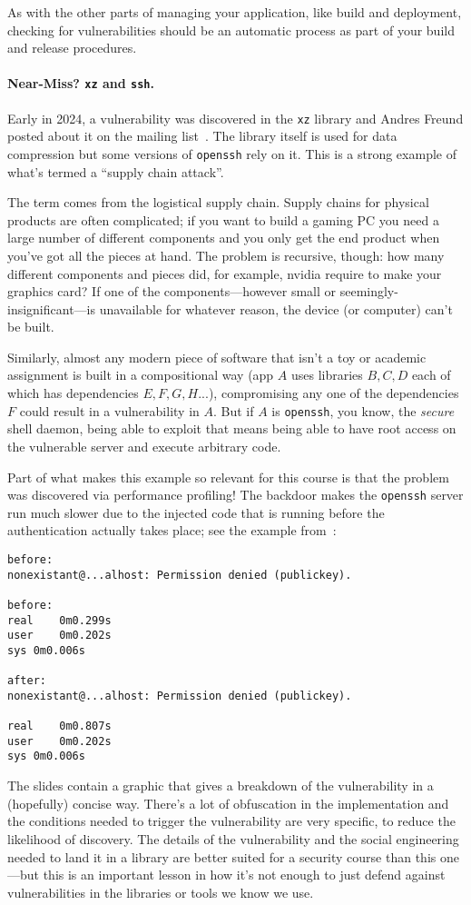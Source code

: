 As with the other parts of managing your application, like build and deployment, checking for vulnerabilities should be an automatic process as part of your build and release procedures. 


\paragraph{Near-Miss? \texttt{xz} and \texttt{ssh}.} Early in 2024, a vulnerability was discovered in the \texttt{xz} library and Andres Freund posted about it on the mailing list~\cite{xzlib}. The library itself is used for data compression but some versions of \texttt{openssh} rely on it. This is a strong example of what's termed a ``supply chain attack''. 

The term comes from the logistical supply chain. Supply chains for physical products are often complicated; if you want to build a gaming PC you need a large number of different components and you only get the end product when you've got all the pieces at hand. The problem is recursive, though: how many different components and pieces did, for example, nvidia require to make your graphics card? If one of the components---however small or seemingly-insignificant---is unavailable for whatever reason, the device (or computer) can't be built. 

Similarly, almost any modern piece of software that isn't a toy or academic assignment is built in a compositional way (app $A$ uses libraries $B, C, D$ each of which has dependencies $E, F, G, H...$), compromising any one of the dependencies $F$ could result in a vulnerability in $A$. But if $A$ is \texttt{openssh}, you know, the \textit{secure} shell daemon, being able to exploit that means being able to have root access on the vulnerable server and execute arbitrary code. 

Part of what makes this example so relevant for this course is that the problem was discovered via performance profiling! The backdoor makes the \texttt{openssh} server run much slower due to the injected code that is running before the authentication actually takes place; see the example from~\cite{xzlib}:

\begin{verbatim}
before:
nonexistant@...alhost: Permission denied (publickey).

before:
real	0m0.299s
user	0m0.202s
sys	0m0.006s

after:
nonexistant@...alhost: Permission denied (publickey).

real	0m0.807s
user	0m0.202s
sys	0m0.006s
\end{verbatim}

The slides contain a graphic that gives a breakdown of the vulnerability in a (hopefully) concise way. There's a lot of obfuscation in the implementation and the conditions needed to trigger the vulnerability are very specific, to reduce the likelihood of discovery. The details of the vulnerability and the social engineering needed to land it in a library are better suited for a security course than this one---but this is an important lesson in how it's not enough to just defend against vulnerabilities in the libraries or tools we know we use.





